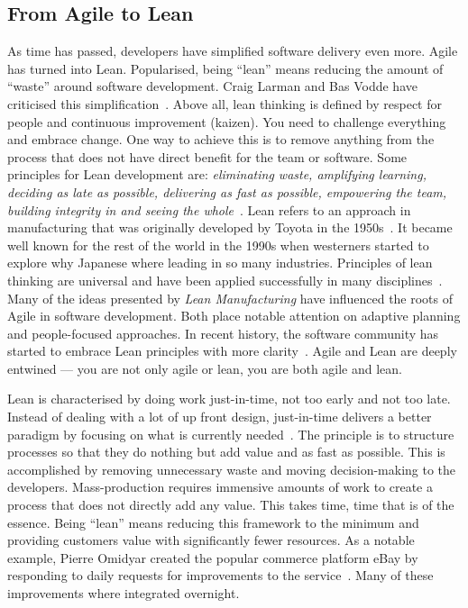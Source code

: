 \documentclass[english]{tktltiki2}
\begin{document}
\subsection{From Agile to Lean}

As time has passed, developers have simplified software delivery even more. Agile has turned into Lean. Popularised, being “lean” means reducing the amount of “waste” around software development. Craig Larman and Bas Vodde have criticised this simplification~\cite{LV09}. Above all, lean thinking is defined by respect for people and continuous improvement (kaizen). You need to challenge everything and embrace change. One way to achieve this is to remove anything from the process that does not have direct benefit for the team or software. Some principles for Lean development are: \emph{eliminating waste, amplifying learning, deciding as late as possible, delivering as fast as possible, empowering the team, building integrity in and seeing the whole}~\cite{PP03}. Lean refers to an approach in manufacturing that was originally developed by Toyota in the 1950s~\cite{Fow08}. It became well known for the rest of the world in the 1990s when westerners started to explore why Japanese where leading in so many industries. Principles of lean thinking are universal and have been applied successfully in many disciplines~\cite{Pop02}. Many of the ideas presented by \emph{Lean Manufacturing} have influenced the roots of Agile in software development. Both place notable attention on adaptive planning and people-focused approaches. In recent history, the software community has started to embrace Lean principles with more clarity~\cite{Fow08}. Agile and Lean are deeply entwined — you are not only agile or lean, you are both agile and lean.

Lean is characterised by doing work just-in-time, not too early and not too late. Instead of dealing with a lot of up front design, just-in-time delivers a better paradigm by focusing on what is currently needed~\cite{Pop02}. The principle is to structure processes so that they do nothing but add value and as fast as possible. This is accomplished by removing unnecessary waste and moving decision-making to the developers. Mass-production requires immensive amounts of work to create a process that does not directly add any value. This takes time, time that is of the essence. Being “lean” means reducing this framework to the minimum and providing customers value with significantly fewer resources. As a notable example, Pierre Omidyar created the popular commerce platform eBay by responding to daily requests for improvements to the service~\cite{Pop02}. Many of these improvements where integrated overnight.
\end{document}
